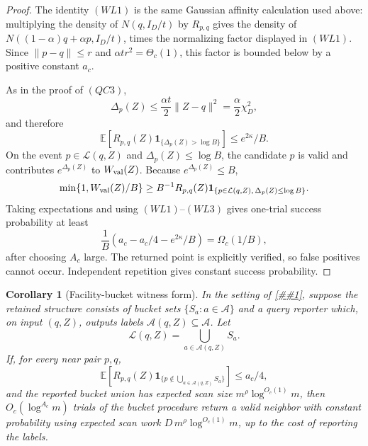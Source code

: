 \documentclass[10pt]{article}
\newcommand{\cref}[1]{\ref{##1}}
\newtheorem{corollary}[theorem]{Corollary}
\theoremstyle{definition}
\newcommand{\E}{\mathbb{E}}
\begin{document}
\begin{proof}
   The identity \((WL1)\) is the same Gaussian affinity calculation used above:
   multiplying the density of \(N(q,I_D/t)\) by \(R_{p,q}\) gives the density
   of \(N((1-\alpha)q+\alpha p,I_D/t)\), times the normalizing factor
   displayed in \((WL1)\).  Since \(\|p-q\|\le r\) and
   \(\alpha t r^2=\Theta_c(1)\), this factor is bounded below by a positive
   constant \(a_c\).

   As in the proof of \((QC3)\),
   \[
      \Delta_p(Z)
      \le
      \frac{\alpha t}{2}\|Z-q\|^2
      =
      \frac{\alpha}{2}\chi_D^2 ,
   \]
   and therefore
   \[
      \E\left[
         R_{p,q}(Z)\mathbf 1_{\{\Delta_p(Z)>\log B\}}
      \right]
      \le e^{2\kappa}/B .
      \tag{WL3}
   \]
   On the event \(p\in\mathcal L(q,Z)\) and \(\Delta_p(Z)\le\log B\), the
   candidate \(p\) is valid and contributes \(e^{\Delta_p(Z)}\) to
   \(W_{\rm val}(Z)\).  Because \(e^{\Delta_p(Z)}\le B\),
   \[
      \min\{1,W_{\rm val}(Z)/B\}
      \ge
      B^{-1}R_{p,q}(Z)
      \mathbf 1_{\{p\in\mathcal L(q,Z),\,\Delta_p(Z)\le\log B\}} .
   \]
   Taking expectations and using \((WL1)\)--\((WL3)\) gives one-trial success
   probability at least
   \[
      \frac1B\left(a_c-a_c/4-e^{2\kappa}/B\right)
      =
      \Omega_c(1/B),
   \]
   after choosing \(A_c\) large.  The returned point is explicitly verified,
   so false positives cannot occur.  Independent repetition gives constant
   success probability.
\end{proof}

\begin{corollary}[Facility-bucket witness form]
   \label{cor:facility-bucket-witness}
   In the setting of \cref{lem:smoothed-witness-list-compiler}, suppose the
   retained structure consists of bucket sets \(\{S_a:a\in\mathcal A\}\) and a
   query reporter which, on input \((q,Z)\), outputs labels
   \(\mathcal A(q,Z)\subseteq\mathcal A\).  Let
   \[
      \mathcal L(q,Z)=\bigcup_{a\in\mathcal A(q,Z)}S_a .
   \]
   If, for every near pair \(p,q\),
   \[
      \E\left[
         R_{p,q}(Z)
         \mathbf 1_{\{p\notin\bigcup_{a\in\mathcal A(q,Z)}S_a\}}
      \right]
      \le a_c/4,
      \tag{FB1}
   \]
   and the reported bucket union has expected scan size
   \(m^\rho\log^{O_c(1)}m\), then \(O_c(\log^{A_c}m)\) trials of the bucket
   procedure return a valid neighbor with constant probability using expected
   scan work \(D\,m^\rho\log^{O_c(1)}m\), up to the cost of reporting the
   labels.
\end{corollary}
\end{document}
